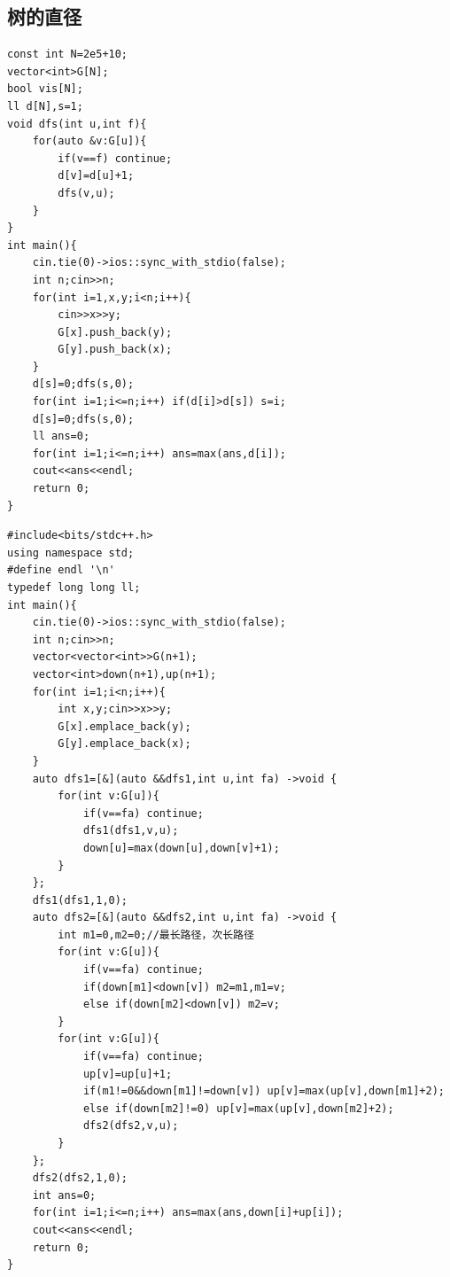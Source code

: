 \documentclass[11pt,a4paper,twocolumn]{ctexart}  %
\begin{document}
\subsection{树的直径}
\begin{lstlisting}[caption={两遍dfs查直径},label={lst:树的直径}]
const int N=2e5+10;
vector<int>G[N];
bool vis[N];
ll d[N],s=1;
void dfs(int u,int f){
    for(auto &v:G[u]){
        if(v==f) continue;
        d[v]=d[u]+1;
        dfs(v,u);
    }
}
int main(){
    cin.tie(0)->ios::sync_with_stdio(false);
    int n;cin>>n;
    for(int i=1,x,y;i<n;i++){
        cin>>x>>y;
        G[x].push_back(y);
        G[y].push_back(x);
    }
    d[s]=0;dfs(s,0);
    for(int i=1;i<=n;i++) if(d[i]>d[s]) s=i;
    d[s]=0;dfs(s,0);
    ll ans=0;
    for(int i=1;i<=n;i++) ans=max(ans,d[i]);
    cout<<ans<<endl;
    return 0;
}
\end{lstlisting}

\begin{lstlisting}[caption={树形dp求直径},label={lst:树形dp求直径}]
#include<bits/stdc++.h>
using namespace std;
#define endl '\n'
typedef long long ll;
int main(){
    cin.tie(0)->ios::sync_with_stdio(false);
    int n;cin>>n;
    vector<vector<int>>G(n+1);
    vector<int>down(n+1),up(n+1);
    for(int i=1;i<n;i++){
        int x,y;cin>>x>>y;
        G[x].emplace_back(y);
        G[y].emplace_back(x);
    }
    auto dfs1=[&](auto &&dfs1,int u,int fa) ->void {
        for(int v:G[u]){
            if(v==fa) continue;
            dfs1(dfs1,v,u);
            down[u]=max(down[u],down[v]+1);
        }
    };
    dfs1(dfs1,1,0);
    auto dfs2=[&](auto &&dfs2,int u,int fa) ->void {
        int m1=0,m2=0;//最长路径，次长路径
        for(int v:G[u]){
            if(v==fa) continue;
            if(down[m1]<down[v]) m2=m1,m1=v;
            else if(down[m2]<down[v]) m2=v;
        }
        for(int v:G[u]){
            if(v==fa) continue;
            up[v]=up[u]+1;
            if(m1!=0&&down[m1]!=down[v]) up[v]=max(up[v],down[m1]+2);
            else if(down[m2]!=0) up[v]=max(up[v],down[m2]+2);
            dfs2(dfs2,v,u);
        }
    };
    dfs2(dfs2,1,0);
    int ans=0;
    for(int i=1;i<=n;i++) ans=max(ans,down[i]+up[i]);
    cout<<ans<<endl;
    return 0;
}
\end{lstlisting}
\end{document}
